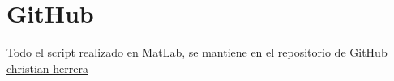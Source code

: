 \section*{GitHub}
Todo el script realizado en MatLab, se mantiene en el repositorio de GitHub \href{https://github.com/christian-herrera/comu-lab-unlp}{christian-herrera}